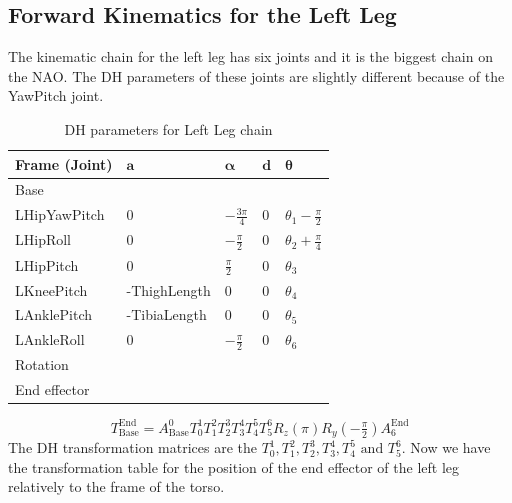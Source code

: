 \subsection{Forward Kinematics for the Left Leg}
The kinematic chain for the left leg has six joints and it is the biggest chain on the NAO. The DH parameters of these joints are slightly different because of the YawPitch joint.
\begin{table}[!h]
\centering
\begin{tabular}{|l|>{\centering\arraybackslash}m{2.55cm}|>{\centering\arraybackslash}m{2.55cm}|>{\centering\arraybackslash}m{2.55cm}|>{\centering\arraybackslash}m{2.55cm}|}
\hline
\textbf{Frame (Joint)} & \(\mathbf{a}\) & \(\boldsymbol{\alpha}\) & \(\mathbf{d}\) & \(\boldsymbol{\theta}\)\\ \hline
Base & \multicolumn{4}{|c|}{\(A(0,\text{\footnotesize{HipOffsetY}},\text{\footnotesize{-HipOffsetZ}})\)} \\ \hline
LHipYawPitch & \(0\) & \(-\frac{3\pi}{4}\) & \(0\) & \(\theta_1 - \frac{\pi}{2}\) \\ \hline
LHipRoll & \(0\) & \(-\frac{\pi}{2}\) & \(0\) & \(\theta_2 + \frac{\pi}{4}\) \\ \hline
LHipPitch & \(0\) & \(\frac{\pi}{2}\) & \(0\) & \(\theta_3\) \\ \hline
LKneePitch & \footnotesize{-ThighLength} & \(0\) & \(0\) & \(\theta_4\) \\ \hline
LAnklePitch & \footnotesize{-TibiaLength} & \(0\) & \(0\) & \(\theta_5\) \\ \hline
LAnkleRoll & \(0\) & \(-\frac{\pi}{2}\) & \(0\) & \(\theta_6\) \\ \hline
Rotation & \multicolumn{4}{c|}{\(R_z(\pi)R_y(-\tfrac{\pi}{2})\)} \\ \hline
End effector & \multicolumn{4}{c|}{\(A(0,0,\text{\footnotesize{-FootHeight}})\)} \\ \hline
\end{tabular}
\caption{DH parameters for Left Leg chain}
\label{tab:DH parameters for Left Leg chain}
\end{table}
\[
T^\text{End}_\text{Base} = A^0_\text{Base}T^1_0T^2_1T^3_2T^4_3T^5_4T^6_5R_z(\pi)R_y(-\tfrac{\pi}{2})A^\text{End}_{6}
\]
The DH transformation matrices are the \(T^1_0,T^2_1,T^3_2,T^4_3,T^5_4\text{ and }T^6_5\). Now we have the transformation table for the position of the end effector of the left leg relatively to the frame of the torso.

